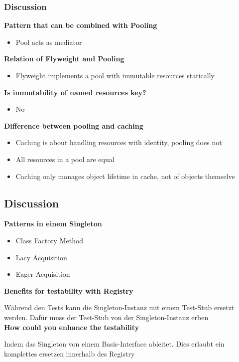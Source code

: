 \subsubsection{Discussion}
\textbf{Pattern that can be combined with Pooling}
\begin{itemize}
    \item Pool acts as mediator
\end{itemize}
\textbf{Relation of Flyweight and Pooling}
\begin{itemize}
    \item Flyweight implements a pool with immutable resources statically
\end{itemize}
\textbf{Is immutability of named resources key?}
\begin{itemize}
    \item No
\end{itemize}
\textbf{Difference between pooling and caching}
\begin{itemize}
    \item Caching is about handling resources with identity, pooling does not
    \item All resources in a pool are equal
    \item Caching only manages object lifetime in cache, not of objects themselve
\end{itemize}

\subsection{Discussion}

\textbf{Patterns in einem Singleton}

\begin{itemize}
    \item Class Factory Method
    \item Lacy Acquisition
    \item Eager Acquisition
\end{itemize}
\vspace{10pt}
\textbf{Benefits for testability with Registry}

Während den Tests kann die Singleton-Instanz mit einem Test-Stub ersetzt werden. Dafür muss der Test-Stub von der Singleton-Instanz erben \\

\textbf{How could you enhance the testability}

Indem das Singleton von einem Basis-Interface ableitet. Dies erlaubt ein komplettes ersetzen innerhalb des Registry \\

